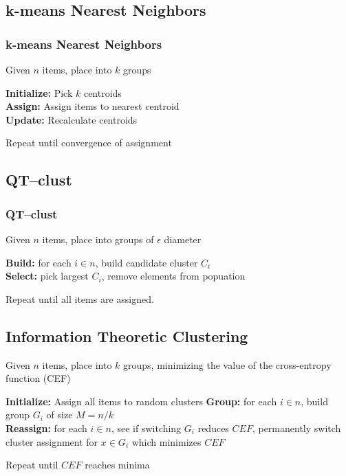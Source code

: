 \documentclass{beamer}
\begin{document}
\subsection{k-means Nearest Neighbors}
\begin{frame}
\frametitle{k-means Nearest Neighbors}
Given $n$ items, place into $k$ groups\\

\bigskip

\textbf{Initialize:} Pick $k$ centroids\\
\textbf{Assign:} Assign items to nearest centroid\\
\textbf{Update:} Recalculate centroids\\

\bigskip

Repeat until convergence of assignment

\end{frame}

\begin{frame}
\end{frame}


\subsection{QT--clust}
\begin{frame}
\frametitle{QT--clust}
Given $n$ items, place into groups of $\epsilon$ diameter\\

\bigskip

\textbf{Build:} for each $i \in n$, build candidate cluster $C_i$ \\
\textbf{Select:} pick largest $C_i$, remove elements from popuation \\

\bigskip

Repeat until all items are assigned.

\end{frame}


\subsection{Information Theoretic Clustering}
\begin{frame}
Given $n$ items, place into $k$ groups, minimizing the value of the cross-entropy function (CEF) \\

\bigskip

\textbf{Initialize:} Assign all items to random clusters
\textbf{Group:} for each $i \in n$, build group $G_i$ of size $M = n / k$ \\
\textbf{Reassign:} for each $i \in n$, see if switching $G_i$ reduces $CEF$, permanently switch cluster assignment for $x \in G_i$ which minimizes $CEF$ \\

\bigskip

Repeat until $CEF$ reaches minima
\end{frame}

\end{document}
